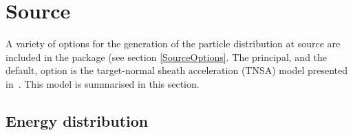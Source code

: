 \graphicspath{ {05-Source/Figures/} }

\section{Source}

A variety of options for the generation of the particle distribution
at source are included in the package (see
section \ref{SourceOptions}.
The principal, and the default, option is the target-normal sheath
acceleration (TNSA) model presented in~\cite{10.1038/nphys199}.
This model is summarised in this section.

\subsection{Energy distribution}

